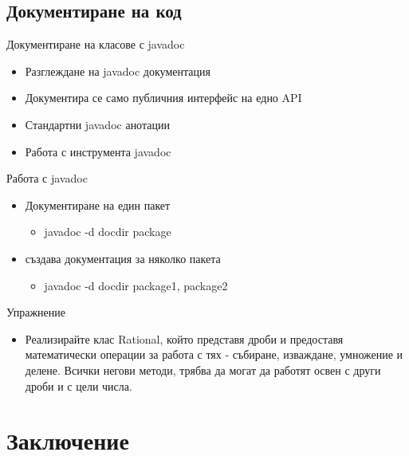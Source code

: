 \documentclass{beamer}
\begin{document}
\subsection{Документиране на код}
\begin{frame}{Документиране на класове с javadoc}
  \transdissolve
  \begin{itemize}
  \item Разглеждане на javadoc документация
  \item Документира се само публичния интерфейс на едно API
  \item Стандартни javadoc анотации
  \item Работа с инструмента javadoc
  \end{itemize}
\end{frame}

\begin{frame}{Работа с javadoc}
  \transdissolve
  \begin{itemize}
  \item Документиране на един пакет
    \begin{itemize}
    \item javadoc -d docdir package
    \end{itemize}
  \item създава документация за няколко пакета
    \begin{itemize}
    \item javadoc -d docdir package1, package2
    \end{itemize}
  \end{itemize}
\end{frame}

\begin{frame}{Упражнение}
  \transdissolve
  \begin{itemize}
    \item Реализирайте клас Rational, който представя дроби и
      предоставя математически операции за работа с тях - събиране,
      изваждане, умножение и делене. Всички негови методи, трябва да
      могат да работят освен с други дроби и с цели числа.
  \end{itemize}
\end{frame}

\section*{Заключение}
\end{document}
